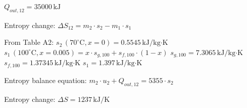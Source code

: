 \( Q_{out,12} = 35000 \, \text{kJ} \)  

Entropy change:  
\( \Delta S_{12} = m_2 \cdot s_2 - m_1 \cdot s_1 \)  

From Table A2:  
\( s_2 \, (70^\circ \text{C}, x = 0) = 0.5545 \, \text{kJ/kg·K} \)  
\( s_1 \, (100^\circ \text{C}, x = 0.005) = x \cdot s_{g,100} + s_{f,100} \cdot (1 - x) \)  
\( s_{g,100} = 7.3065 \, \text{kJ/kg·K} \)  
\( s_{f,100} = 1.37345 \, \text{kJ/kg·K} \)  
\( s_1 = 1.397 \, \text{kJ/kg·K} \)  

Entropy balance equation:  
\( m_2 \cdot u_2 + Q_{out,12} = 5355 \cdot s_2 \)  

Entropy change:  
\( \Delta S = 1237 \, \text{kJ/K} \)